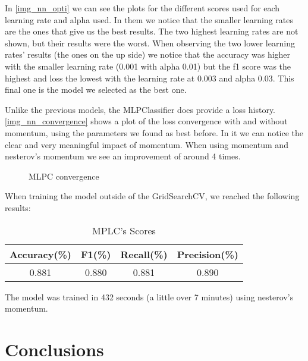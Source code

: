 \documentclass[12pt]{article}
\begin{document}
    \par 
        In \autoref{img_nn_opti} we can see the plots for the different scores used for each learning rate and alpha used. In them we notice that 
        the smaller learning rates are the ones that give us the best results. The two highest learning rates are not shown, but their results 
        were the worst. When observing the two lower learning rates' results (the ones on the up side) we notice that the accuracy was higher with 
        the smaller learning rate (0.001 with alpha 0.01) but the f1 score was the highest and loss the lowest with the learning rate at 0.003 
        and alpha 0.03. This final one is the model we selected as the best one.
    \par 
        Unlike the previous models, the MLPClassifier does provide a loss history. \autoref{img_nn_convergence} shows a plot of the loss convergence 
        with and without momentum, using the parameters we found as best before. In it we can notice the clear and very meaningful impact of momentum. When using 
        momentum and nesterov's momentum we see an improvement of around 4 times.
    \begin{figure}[!tb]
        \caption{MLPC convergence}
        \label{img_nn_convergence}
    \end{figure}
    \par
        When training the model outside of the GridSearchCV, we reached the following results:
    \begin{center}
        \begin{table}
        \caption{MPLC's Scores}
        \begin{center}
        \begin{tabular}{|c |c |c |c|}
            \hline
            Accuracy(\%) & F1(\%) & Recall(\%) & Precision(\%) \\ [0.5ex] 
            \hline
            0.881 & 0.880 & 0.881 & 0.890 \\ 
            \hline
        \end{tabular}
        \label{tab_nn}
        \end{center}
    \end{table}
    \end{center}
    \par 
        The model was trained in 432 seconds (a little over 7 minutes) using nesterov's momentum.

\clearpage
\section{Conclusions}
\label{section.conclusions}
\end{document}
